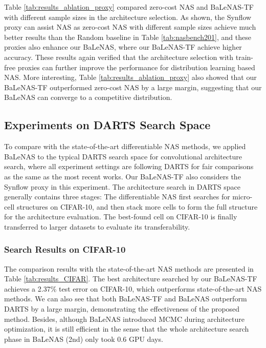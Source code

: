 \documentclass[10pt,twocolumn,letterpaper]{article}
\begin{document}
Table \ref{tab:results_ablation_proxy} compared zero-cost NAS and BaLeNAS-TF with different sample sizes in the architecture selection. As shown, the Synflow proxy can assist NAS as zero-cost NAS with different sample sizes achieve much better results than the Random baseline in Table \ref{tab:nasbench201}, and these proxies also enhance our BaLeNAS, where our BaLeNAS-TF achieve higher accuracy. These results again verified that the architecture selection with train-free proxies can further improve the performance for distribution learning based NAS. More interesting, Table \ref{tab:results_ablation_proxy} also showed that our BaLeNAS-TF outperformed zero-cost NAS by a large margin, suggesting that our BaLeNAS can converge to a competitive distribution.

















\subsection{Experiments on DARTS Search Space}
To compare with the state-of-the-art differentiable NAS methods, we applied BaLeNAS to the typical DARTS search space \cite{liu2018darts,GDAS,li2019random} for convolutional architecture search, where all experiment settings are following DARTS \cite{liu2018darts} for fair comparisons as the same as the most recent works. Our BaLeNAS-TF also considers the Synflow proxy in this experiment. The architecture search in DARTS space generally contains three stages: The differentiable NAS first searches for micro-cell structures on CIFAR-10, and then stack more cells to form the full structure for the architecture evaluation. The best-found cell on CIFAR-10 is finally transferred to larger datasets to evaluate its transferability. \vspace{-2mm}

\subsubsection{Search Results on CIFAR-10}


The comparison results with the state-of-the-art NAS methods are presented in Table \ref{tab:results_CIFAR}. The best architecture searched by our BaLeNAS-TF achieves a 2.37\% test error on CIFAR-10, which outperforms state-of-the-art NAS methods. We can also see that both BaLeNAS-TF and BaLeNAS outperform DARTS by a large margin, demonstrating the effectiveness of the proposed method. Besides, although BaLeNAS introduced MCMC during architecture optimization, it is still efficient in the sense that the whole architecture search phase in BaLeNAS (2nd) only took 0.6 GPU days. 
\end{document}
